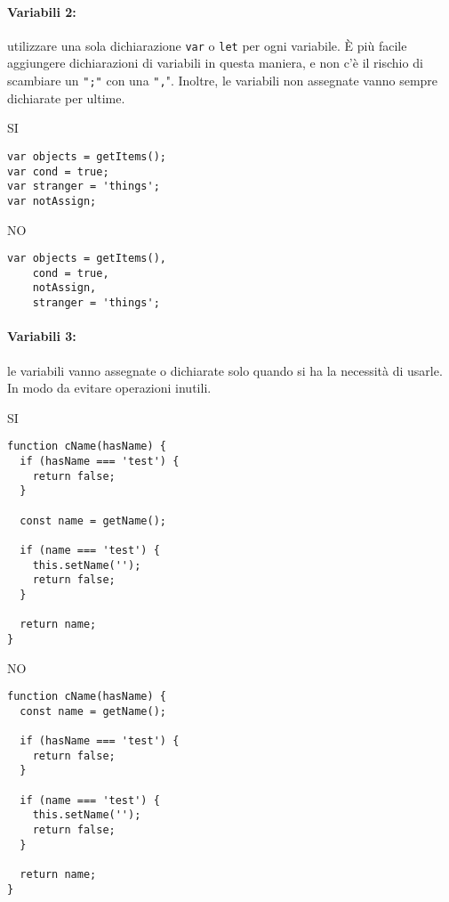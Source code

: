 \documentclass[../ProcessiPrimari.tex]{subfiles}
\begin{document}
\paragraph{Variabili 2:}utilizzare una sola dichiarazione \texttt{var} o \texttt{let} per ogni variabile. È più facile aggiungere dichiarazioni di variabili in questa maniera, e non c'è il rischio di scambiare un \texttt{";"} con una \texttt{",}". Inoltre, le variabili non assegnate vanno sempre dichiarate per ultime.

\begin{center}{
\begin{minipage}{6cm}
	{\begin{center}SI\end{center}}
	\begin{Verbatim}[frame=single]
var objects = getItems();
var cond = true;
var stranger = 'things';
var notAssign;
	\end{Verbatim}
\end{minipage}
\hfil
\begin{minipage}{6.5cm}
	{\begin{center}NO\end{center}}
	\begin{Verbatim}[frame=single]
var objects = getItems(),
	cond = true,
	notAssign,
	stranger = 'things';
	\end{Verbatim}
\end{minipage}
}
\end{center}

\paragraph{Variabili 3:}le variabili vanno assegnate o dichiarate solo quando si ha la necessità di usarle. In modo da evitare operazioni inutili.
\begin{center}{
\begin{minipage}{6cm}
	{\begin{center}SI\end{center}}
	\begin{Verbatim}[frame=single]
function cName(hasName) {
  if (hasName === 'test') {
    return false;
  }

  const name = getName();

  if (name === 'test') {
    this.setName('');
    return false;
  }

  return name;
}
	\end{Verbatim}
\end{minipage}
\hfil
\begin{minipage}{6cm}
	{\begin{center}NO\end{center}}
	\begin{Verbatim}[frame=single]
function cName(hasName) {
  const name = getName();

  if (hasName === 'test') {
    return false;
  }

  if (name === 'test') {
    this.setName('');
    return false;
  }

  return name;
}	
\end{Verbatim}
\end{minipage}
}
\end{center}
\end{document}
